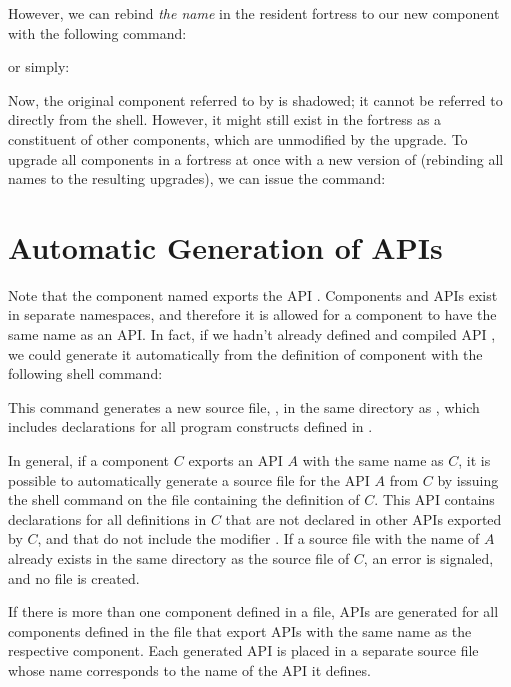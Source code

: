 However, we can rebind \emph{the name} 
in the resident fortress to our new component with the following command:


or simply:


Now, the original component referred to by  is
shadowed; it cannot be referred to directly from the shell.
However, it might still exist in the fortress as a constituent of
other components, which are unmodified by the upgrade.
To upgrade all components in a fortress at once
with a new version of  (rebinding all
names to the resulting upgrades), we can issue the command:


\section{Automatic Generation of APIs}

Note that the component named  exports the API
. Components and APIs exist in separate namespaces, and therefore
it is allowed for a component to have the same name as an API.
In fact, if we hadn't already defined and compiled API ,
we could generate it automatically
from the definition of component 
with the following shell command:


This command generates a new source file, , in the
same directory as , which includes declarations for
all program constructs defined in .

In general, if a component $C$ exports an API $A$ with the same name as $C$,
it is possible to automatically generate a source file
for the API $A$ from $C$
by issuing the shell command  on the file
containing the definition of $C$.
This API contains declarations for all definitions in $C$ that are not
declared in other APIs exported by $C$, and that do not include
the modifier .
If a source file with the name of $A$ already exists in the
same directory as the source file of $C$, an error is signaled,
and no file is created.

If there is more than one component defined in a file,
APIs are generated for all components defined in the file that
export APIs with the same name as the respective component.
Each generated API is placed in a separate source file whose
name corresponds to the name of the API it defines.

